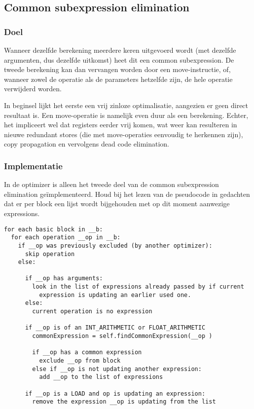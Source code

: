 \documentclass[a4paper,10pt]{article}
\begin{document}
\subsection{Common subexpression elimination}
\subsubsection{Doel}
Wanneer dezelfde berekening meerdere keren uitgevoerd wordt (met dezelfde
argumenten, dus dezelfde uitkomst) heet dit een common subexpression. De 
tweede berekening kan dan vervangen worden door een move-instructie, of,
wanneer zowel de operatie als de parameters hetzelfde zijn, de hele operatie
verwijderd worden.

In beginsel lijkt het eerste een vrij zinloze optimalisatie, aangezien er geen
direct resultaat is. Een move-operatie is namelijk even duur als een
berekening. Echter, het impliceert wel dat registers eerder vrij komen, wat
weer kan resulteren in nieuwe redundant stores (die met move-operaties
eenvoudig te herkennen zijn), copy propagation en vervolgens dead code
elimination.

\subsubsection{Implementatie}
In de optimizer is alleen het tweede deel van de common subexpression
elimination ge\"implementeerd. Houd bij het lezen van de pseudocode in
gedachten dat er per block een lijst wordt bijgehouden met op dit moment
aanwezige expressions.
\begin{verbatim}
for each basic block in __b:
  for each operation __op in __b:
    if __op was previously excluded (by another optimizer):
      skip operation
    else:

      if __op has arguments:
        look in the list of expressions already passed by if current
          expression is updating an earlier used one.
      else:
        current operation is no expression

      if __op is of an INT_ARITHMETIC or FLOAT_ARITHMETIC
        commonExpression = self.findCommonExpression(__op )
        
        if __op has a common expression
          exclude __op from block
        else if __op is not updating another expression:
          add __op to the list of expressions

      if __op is a LOAD and op is updating an expression:
        remove the expression __op is updating from the list
\end{verbatim}
\end{document}
